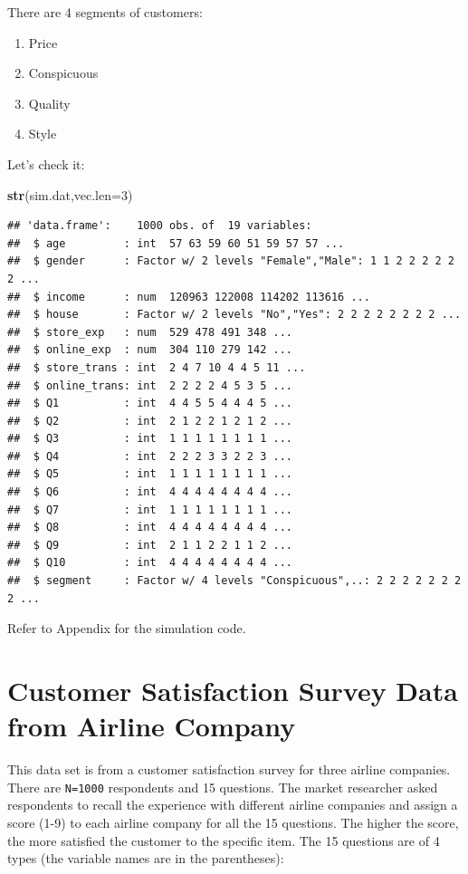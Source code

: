 \documentclass[12pt,]{krantz}
\makeatletter
\newenvironment{Shaded}{\begin{snugshade}}{\end{snugshade}}
\newcommand{\KeywordTok}[1]{\textcolor[rgb]{0.27,0.27,0.27}{\textbf{#1}}}
\newcommand{\DataTypeTok}[1]{\textcolor[rgb]{0.27,0.27,0.27}{#1}}
\newcommand{\DecValTok}[1]{\textcolor[rgb]{0.06,0.06,0.06}{#1}}
\newcommand{\NormalTok}[1]{#1}
\providecommand{\tightlist}{%
  \setlength{\itemsep}{0pt}\setlength{\parskip}{0pt}}
\newenvironment{kframe}{%
\medskip{}
\setlength{\fboxsep}{.8em}
 \def\at@end@of@kframe{}%
 \ifinner\ifhmode%
  \def\at@end@of@kframe{\end{minipage}}%
  \begin{minipage}{\columnwidth}%
 \fi\fi%
 \def\FrameCommand##1{\hskip\@totalleftmargin \hskip-\fboxsep
 \colorbox{shadecolor}{##1}\hskip-\fboxsep
     \hskip-\linewidth \hskip-\@totalleftmargin \hskip\columnwidth}%
 \MakeFramed {\advance\hsize-\width
   \@totalleftmargin\z@ \linewidth\hsize
   \@setminipage}}%
 {\par\unskip\endMakeFramed%
 \at@end@of@kframe}
\renewenvironment{Shaded}{\begin{kframe}}{\end{kframe}}
\theoremstyle{definition}
\theoremstyle{definition}
\theoremstyle{definition}
\theoremstyle{remark}
\makeatother
\begin{document}
There are 4 segments of customers:

\begin{enumerate}
\def\labelenumi{\arabic{enumi}.}
\tightlist
\item
  Price
\item
  Conspicuous
\item
  Quality
\item
  Style
\end{enumerate}

Let's check it:

\begin{Shaded}
\begin{Highlighting}[]
\KeywordTok{str}\NormalTok{(sim.dat,}\DataTypeTok{vec.len=}\DecValTok{3}\NormalTok{)}
\end{Highlighting}
\end{Shaded}

\begin{verbatim}
## 'data.frame':    1000 obs. of  19 variables:
##  $ age         : int  57 63 59 60 51 59 57 57 ...
##  $ gender      : Factor w/ 2 levels "Female","Male": 1 1 2 2 2 2 2 2 ...
##  $ income      : num  120963 122008 114202 113616 ...
##  $ house       : Factor w/ 2 levels "No","Yes": 2 2 2 2 2 2 2 2 ...
##  $ store_exp   : num  529 478 491 348 ...
##  $ online_exp  : num  304 110 279 142 ...
##  $ store_trans : int  2 4 7 10 4 4 5 11 ...
##  $ online_trans: int  2 2 2 2 4 5 3 5 ...
##  $ Q1          : int  4 4 5 5 4 4 4 5 ...
##  $ Q2          : int  2 1 2 2 1 2 1 2 ...
##  $ Q3          : int  1 1 1 1 1 1 1 1 ...
##  $ Q4          : int  2 2 2 3 3 2 2 3 ...
##  $ Q5          : int  1 1 1 1 1 1 1 1 ...
##  $ Q6          : int  4 4 4 4 4 4 4 4 ...
##  $ Q7          : int  1 1 1 1 1 1 1 1 ...
##  $ Q8          : int  4 4 4 4 4 4 4 4 ...
##  $ Q9          : int  2 1 1 2 2 1 1 2 ...
##  $ Q10         : int  4 4 4 4 4 4 4 4 ...
##  $ segment     : Factor w/ 4 levels "Conspicuous",..: 2 2 2 2 2 2 2 2 ...
\end{verbatim}

Refer to Appendix for the simulation code.

\section{Customer Satisfaction Survey Data from Airline
Company}\label{customer-satisfaction-survey-data-from-airline-company}

This data set is from a customer satisfaction survey for three airline
companies. There are \texttt{N=1000} respondents and 15 questions. The
market researcher asked respondents to recall the experience with
different airline companies and assign a score (1-9) to each airline
company for all the 15 questions. The higher the score, the more
satisfied the customer to the specific item. The 15 questions are of 4
types (the variable names are in the parentheses):
\end{document}
